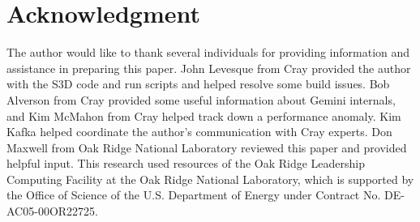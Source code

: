 \documentclass[10pt, conference, compsocconf]{IEEEtran}
\begin{document}
\section*{Acknowledgment} The author would like to thank several individuals
for providing information and assistance in preparing this paper.  John
Levesque from Cray provided the author with the S3D code and run scripts and
helped resolve some build issues. Bob Alverson from Cray provided some useful
information about Gemini internals, and Kim McMahon from Cray helped track down
a performance anomaly.  Kim Kafka helped coordinate the author's communication
with Cray experts.  Don Maxwell from Oak Ridge National Laboratory reviewed
this paper and provided helpful input.  This research used resources of the Oak
Ridge Leadership Computing Facility at the Oak Ridge National Laboratory, which
is supported by the Office of Science of the U.S.  Department of Energy under
Contract No. DE-AC05-00OR22725. 



%
%





\end{document}
